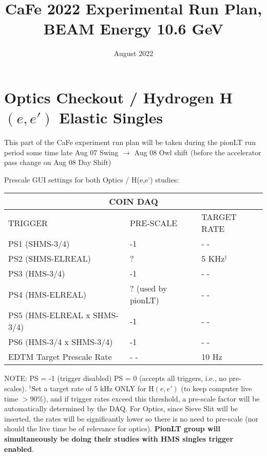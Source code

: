 \documentclass{article}
\title{CaFe 2022 Experimental Run Plan, BEAM Energy 10.6 GeV}
\date{August 2022}
\begin{document}
\maketitle

\section{Optics Checkout / Hydrogen H$(e,e')$ Elastic Singles}
This part of the CaFe experiment run plan will be taken during the pionLT run period
some time late Aug 07 Swing $\rightarrow$ Aug 08 Owl shift (before the accelerator pass change on Aug 08 Day Shift)
    \begin{center}
    Prescale GUI settings for both Optics / H(e,e') studies:
    \begin{tabular}{ |p{6cm}| |p{3cm}| |p{3cm}| }
    \hline
    \multicolumn{3}{|c|}{COIN DAQ} \\
    \hline
    TRIGGER & PRE-SCALE & TARGET RATE\\
    \hline
    PS1 (SHMS-3/4)    & -1  & - - \\
    PS2 (SHMS-ELREAL) &  ?  & 5 KHz$^{\dagger}$ \\
    PS3 (HMS-3/4)     & -1  & - -\\
    PS4 (HMS-ELREAL)  & ? (used by pionLT)  & - - \\
    PS5 (HMS-ELREAL x SHMS-3/4)  & -1 & - -  \\
    PS6 (HMS-3/4 x SHMS-3/4)     & -1 & - -  \\
    \hline
    EDTM Target Prescale Rate & - - & 10 Hz \\
    \hline
    \end{tabular}
    \end{center}
    NOTE: PS = -1 (trigger disabled) PS = 0 (accepts all triggers, i.e., no pre-scales). $^{\dagger}$Set a target rate of 5 kHz ONLY for H$(e,e')$ (to keep computer live time $>90\%$),  and if trigger rates exceed this threshold, 
    a pre-scale factor will be automatically determined by the DAQ. For Optics, since
    Sieve Slit will be inserted, the rates will be significantly lower so there is no need to pre-scale (nor should the live time be of relevance for optics). \textbf{PionLT group will simultaneously be doing their studies with HMS singles trigger enabled}.
    
\end{document}

